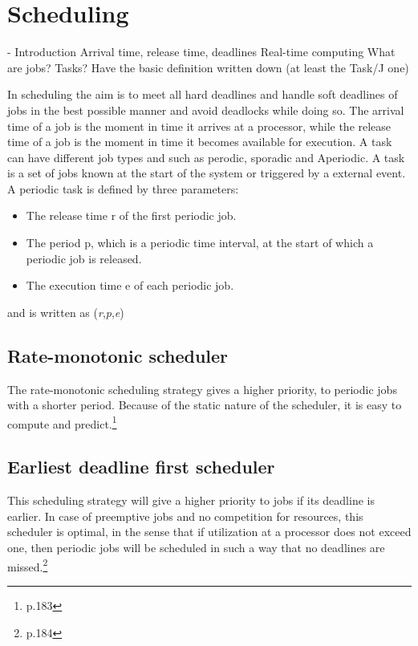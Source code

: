 \section{Scheduling} \label{sc:scheduling}

- Introduction
Arrival time, release time, deadlines
Real-time computing
What are jobs? Tasks?
Have the basic definition written down (at least the Task/J one)


In scheduling the aim is to meet all hard deadlines and handle soft deadlines of jobs in the best possible manner and avoid deadlocks while doing so. The arrival time of a job is the moment in time it arrives at a processor, while the
release time of a job is the moment in time it becomes available for execution. A task can have different job types and such as perodic, sporadic and Aperiodic. A task is a set of jobs known at the start of the system or triggered by a external event.
A periodic task is defined by three parameters:
\begin{itemize}
	\itemsep0em
	\item The release time r of the first periodic job.
	\item The period p, which is a periodic time interval, at the start of which a periodic job is released.
	\item The execution time e of each periodic job.
\end{itemize}
and is written as (\textit{r},\textit{p},\textit{e})

\subsection{Rate-monotonic scheduler}
The rate-monotonic scheduling strategy gives a higher priority, to periodic jobs with a shorter period. Because of the static nature of the scheduler, it is easy to compute and predict.\footnote{\cite{Fokkink1965} p.183}

\subsection{Earliest deadline first scheduler}
This scheduling strategy will give a higher priority to jobs if its deadline is
earlier. In case of preemptive jobs and no competition for resources, this scheduler
is optimal, in the sense that if utilization at a processor does not exceed one, then
periodic jobs will be scheduled in such a way that no deadlines are missed.\footnote{\cite{Fokkink1965} p.184}

